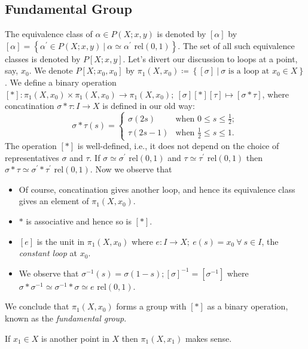 \documentclass[a4paper,11pt]{article}
\newcommand{\lb}{\left(}
\newcommand{\rb}{\right)}
\newcommand{\lc}{\left\lbrace}
\newcommand{\rc}{\right\rbrace}
\newcommand{\ls}{\left[}
\newcommand{\rs}{\right]}
\renewcommand{\t}{\tau}
\renewcommand{\a}{\alpha}
\newcommand{\s}{\sigma}
\newcommand{\inv}{^{-1}}
\newcommand{\rel}{\text{ rel}}
\newcommand{\tends}{\rightarrow}
\newcommand{\dash}{^\prime}
\begin{document}
\subsection{Fundamental Group}
\noindent{}The equivalence class of $\a\in P(X;x,y)$ is denoted by $\ls\a\rs$ by $\ls\a\rs=\lc\a\dash\in P(X;x,y)~|~\a\simeq\a\dash\rel(0,1)\rc$. The set of all such equivalence classes is denoted by $P\ls X; x,y\rs$. Let's divert our discussion to loops at a point, say, $x_0$. We denote $P\ls X; x_0,x_0\rs$ by $\pi_1\lb X,x_0\rb\coloneq \lc\ls\s\rs~|~\s\text{ is a loop at }x_0\in X\rc$. We define a binary operation $[*]:\pi_1\lb X,x_0\rb\times\pi_1\lb X,x_0\rb\tends\pi_1\lb X,x_0\rb;~[\s][*][\t]\mapsto[\s *\t]$, where concatination $\s *\t:I\tends X$ is defined in our old way:
$$\s *\t(s)=\begin{cases}
  \s(2s)&\text{when }0\leq s\leq\frac{1}{2};\\
  \t(2s-1)&\text{when }\frac{1}{2}\leq s\leq 1.
\end{cases}$$
The operation $[*]$ is well-defined, i.e., it does not depend on the choice of representatives $\s$ and $\t$. If $\s\simeq\s\dash\rel(0,1)$ and $\t\simeq\t\dash\rel(0,1)$ then $\s*\t\simeq\s\dash *\t\dash\rel(0,1)$. Now we observe that
\begin{itemize}
\item[(i)]Of course, concatination gives another loop, and hence its equivalence class gives an element of $\pi_1\lb X, x_0\rb$.
\item[(ii)]$*$ is associative and hence so is $[*]$.
\item[(ii)]$[e]$ is the unit in $\pi_1\lb X, x_0\rb$ where $e:I\tends X;~e(s)=x_0~\forall~s\in I$, the \emph{constant loop} at $x_0$.
\item[(iii)]We observe that $\s\inv(s)=\s(1-s); [\s]\inv=\ls\s\inv\rs$ where $\s * \s\inv\simeq \s\inv * \s\simeq e\rel(0,1)$.
\end{itemize}
We conclude that $\pi_1\lb X, x_0\rb$ forms a group with $[*]$ as a binary operation, known as the \emph{fundamental group}.

If $x_1\in X$ is another point in $X$ then $\pi_1\lb X, x_1\rb$ makes sense.
\end{document}
